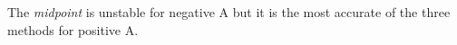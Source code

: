 \documentclass[11pt]{article}
\begin{document}
    \begin{center}
    \end{center}
    { \hspace*{\fill} \\}
    
    \begin{center}
    \end{center}
    { \hspace*{\fill} \\}
    
    The \emph{midpoint} is unstable for negative A but it is the most
accurate of the three methods for positive A.


    
    
    
    
\end{document}
